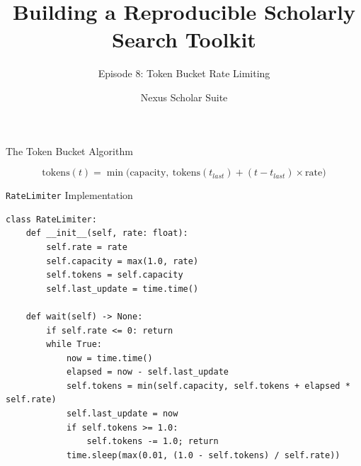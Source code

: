 \documentclass[aspectratio=169]{beamer}
\title{Building a Reproducible Scholarly Search Toolkit}
\subtitle{Episode 8: Token Bucket Rate Limiting}
\author{Nexus Scholar Suite}
\date{}
\begin{document}
\begin{frame}[plain]
  \titlepage
\end{frame}

\begin{frame}{The Token Bucket Algorithm}
  \begin{center}
  \end{center}
  \vspace{0.4cm}
  $$\text{tokens}(t) = \min\Big(\text{capacity},\ \text{tokens}(t_{last}) + (t - t_{last}) \times \text{rate}\Big)$$
\end{frame}

\begin{frame}[fragile]{\texttt{RateLimiter} Implementation}
\begin{lstlisting}[style=nexuspython]
class RateLimiter:
    def __init__(self, rate: float):
        self.rate = rate
        self.capacity = max(1.0, rate)
        self.tokens = self.capacity
        self.last_update = time.time()

    def wait(self) -> None:
        if self.rate <= 0: return
        while True:
            now = time.time()
            elapsed = now - self.last_update
            self.tokens = min(self.capacity, self.tokens + elapsed * self.rate)
            self.last_update = now
            if self.tokens >= 1.0:
                self.tokens -= 1.0; return
            time.sleep(max(0.01, (1.0 - self.tokens) / self.rate))
\end{lstlisting}
\end{frame}
\end{document}
